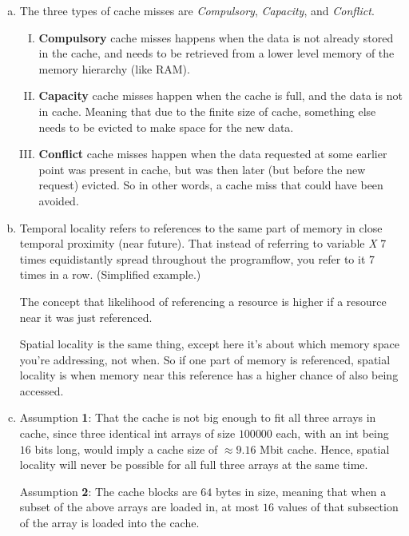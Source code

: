 \documentclass[fontsize=11pt, paper=a4, titlepage]{article}
\begin{document}
\begin{enumerate}[a)]

    \item The three types of cache misses are \textit{Compulsory},
\textit{Capacity}, and \textit{Conflict}.
    \begin{enumerate}[I)]

        \item \textbf{Compulsory} cache misses happens when the data is not
already stored in the cache, and needs to be retrieved from a lower level memory
of the memory hierarchy (like RAM).

        \item \textbf{Capacity} cache misses happen when the cache is full, and
the data is not in cache. Meaning that due to the finite size of cache,
something else needs to be evicted to make space for the new data.

        \item \textbf{Conflict} cache misses happen when the data requested at
some earlier point was present in cache, but was then later (but before the new
request) evicted. So in other words, a cache miss that could have been avoided.

    \end{enumerate}

    \item Temporal locality refers to references to the same part of memory in
close temporal proximity (near future). That instead of referring to variable
\textit{X} 7 times equidistantly spread throughout the programflow, you refer to
it 7 times in a row. (Simplified example.)

The concept that likelihood of referencing a resource is higher if a resource
near it was just referenced.

Spatial locality is the same thing, except here it's about which memory space
you're addressing, not when. So if one part of memory is referenced, spatial
locality is when memory near this reference has a higher chance of also being
accessed.

    \item Assumption \textbf{1}: That the cache is not big enough to fit all
three arrays in cache, since three identical int arrays of size $100 000$ each,
with an int being $16$ bits long, would imply a cache size of $\approx 9.16$
Mbit cache. Hence, spatial locality will never be possible for all full three
arrays at the same time.

Assumption \textbf{2}: The cache blocks are $64$ bytes in size, meaning that
when a subset of the above arrays are loaded in, at most $16$ values of that
subsection of the array is loaded into the cache.


\end{enumerate}
\end{document}
